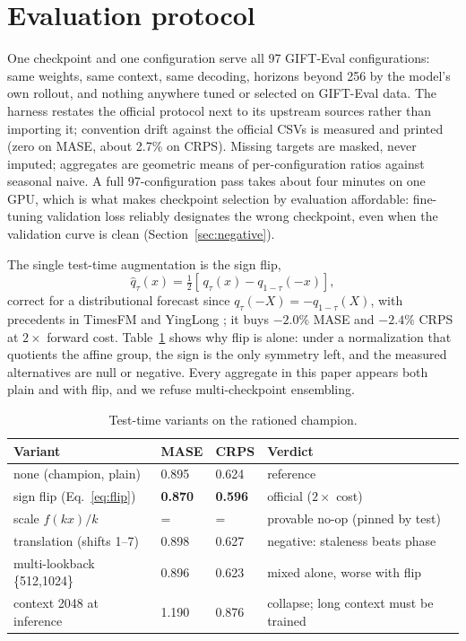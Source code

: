 \section{Evaluation protocol}
\label{sec:protocol}

One checkpoint and one configuration serve all 97 GIFT-Eval
configurations: same weights, same context, same decoding, horizons beyond
256 by the model's own rollout, and nothing anywhere tuned or selected on
GIFT-Eval data. The harness restates the official protocol next to its
upstream sources rather than importing it; convention drift against the
official CSVs is measured and printed (zero on MASE, about 2.7\% on
CRPS). Missing targets are masked, never imputed; aggregates are
geometric means of per-configuration ratios against seasonal naive. A full
97-configuration pass takes about four minutes on one GPU, which is what
makes checkpoint selection by evaluation affordable: fine-tuning
validation loss reliably designates the wrong checkpoint, even when the
validation curve is clean (Section~\ref{sec:negative}).

The single test-time augmentation is the sign flip,
\begin{equation}
\hat{q}_\tau(x) = \tfrac{1}{2}\left[\, q_\tau(x) - q_{1-\tau}(-x) \right],
\label{eq:flip}
\end{equation}
correct for a distributional forecast since $q_\tau(-X) = -q_{1-\tau}(X)$,
with precedents in TimesFM and YingLong
\citep{das2024timesfm,yinglong2025}; it buys $-2.0\%$ MASE and $-2.4\%$
CRPS at $2\times$ forward cost. Table~\ref{tab:tta} shows why flip is
alone: under a normalization that quotients the affine group, the sign is
the only symmetry left, and the measured alternatives are null or
negative. Every aggregate in this paper appears both plain and with flip,
and we refuse multi-checkpoint ensembling.

\begin{table}[t]
\centering
\small
\begin{tabular}{llll}
\toprule
Variant & MASE & CRPS & Verdict \\
\midrule
none (champion, plain) & 0.895 & 0.624 & reference \\
sign flip (Eq.~\ref{eq:flip}) & \textbf{0.870} & \textbf{0.596} & official ($2\times$ cost) \\
scale $f(kx)/k$ & = & = & provable no-op (pinned by test) \\
translation (shifts 1--7) & 0.898 & 0.627 & negative: staleness beats phase \\
multi-lookback \{512,1024\} & 0.896 & 0.623 & mixed alone, worse with flip \\
context 2048 at inference & 1.190 & 0.876 & collapse; long context must be trained \\
\bottomrule
\end{tabular}
\caption{Test-time variants on the rationed champion.}
\label{tab:tta}
\end{table}
